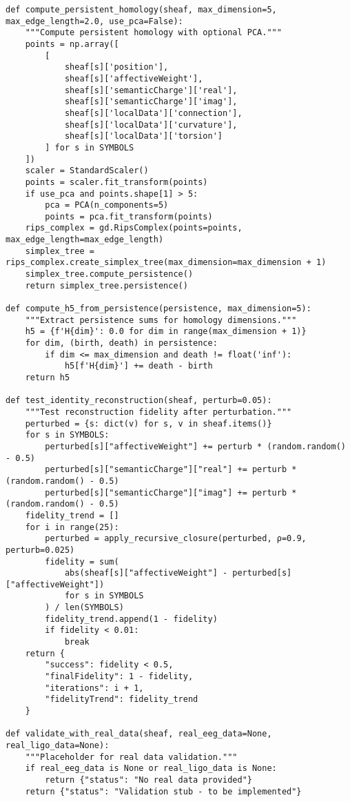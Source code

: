 \documentclass[11pt]{article}
\begin{document}
\begin{lstlisting}
def compute_persistent_homology(sheaf, max_dimension=5, max_edge_length=2.0, use_pca=False):
    """Compute persistent homology with optional PCA."""
    points = np.array([
        [
            sheaf[s]['position'],
            sheaf[s]['affectiveWeight'],
            sheaf[s]['semanticCharge']['real'],
            sheaf[s]['semanticCharge']['imag'],
            sheaf[s]['localData']['connection'],
            sheaf[s]['localData']['curvature'],
            sheaf[s]['localData']['torsion']
        ] for s in SYMBOLS
    ])
    scaler = StandardScaler()
    points = scaler.fit_transform(points)
    if use_pca and points.shape[1] > 5:
        pca = PCA(n_components=5)
        points = pca.fit_transform(points)
    rips_complex = gd.RipsComplex(points=points, max_edge_length=max_edge_length)
    simplex_tree = rips_complex.create_simplex_tree(max_dimension=max_dimension + 1)
    simplex_tree.compute_persistence()
    return simplex_tree.persistence()

def compute_h5_from_persistence(persistence, max_dimension=5):
    """Extract persistence sums for homology dimensions."""
    h5 = {f'H{dim}': 0.0 for dim in range(max_dimension + 1)}
    for dim, (birth, death) in persistence:
        if dim <= max_dimension and death != float('inf'):
            h5[f'H{dim}'] += death - birth
    return h5

def test_identity_reconstruction(sheaf, perturb=0.05):
    """Test reconstruction fidelity after perturbation."""
    perturbed = {s: dict(v) for s, v in sheaf.items()}
    for s in SYMBOLS:
        perturbed[s]["affectiveWeight"] += perturb * (random.random() - 0.5)
        perturbed[s]["semanticCharge"]["real"] += perturb * (random.random() - 0.5)
        perturbed[s]["semanticCharge"]["imag"] += perturb * (random.random() - 0.5)
    fidelity_trend = []
    for i in range(25):
        perturbed = apply_recursive_closure(perturbed, ρ=0.9, perturb=0.025)
        fidelity = sum(
            abs(sheaf[s]["affectiveWeight"] - perturbed[s]["affectiveWeight"])
            for s in SYMBOLS
        ) / len(SYMBOLS)
        fidelity_trend.append(1 - fidelity)
        if fidelity < 0.01:
            break
    return {
        "success": fidelity < 0.5,
        "finalFidelity": 1 - fidelity,
        "iterations": i + 1,
        "fidelityTrend": fidelity_trend
    }

def validate_with_real_data(sheaf, real_eeg_data=None, real_ligo_data=None):
    """Placeholder for real data validation."""
    if real_eeg_data is None or real_ligo_data is None:
        return {"status": "No real data provided"}
    return {"status": "Validation stub - to be implemented"}


\end{lstlisting}
\end{document}
